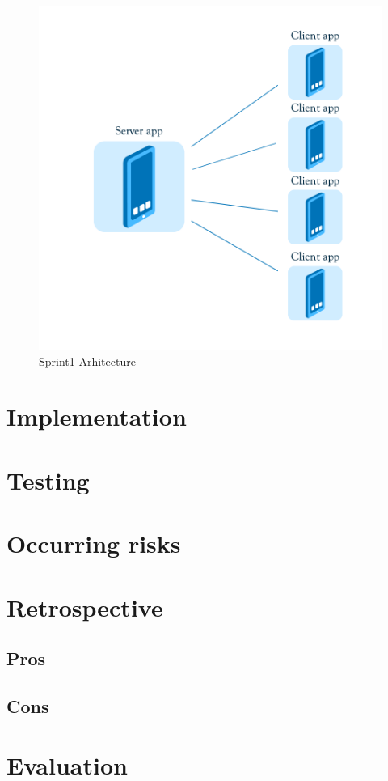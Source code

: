 \begin{figure}[!t]
	\centering
		\includegraphics[width=16cm]{arhitecture.png}
	\caption{Sprint1 Arhitecture}
	\label{fig:sprint1_arhitecture}
\end{figure}

\section{Implementation}
\section{Testing}
\section{Occurring risks}
\section{Retrospective}
\subsection{Pros}
\subsection{Cons}
\section{Evaluation}